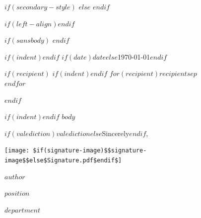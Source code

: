 \documentclass[
$if(papersize)$
$papersize$paper,
$else$
letterpaper,
$endif$,
11pt,
oneside$if(classoption)$,$endif$
$for(classoption)$
$classoption$$sep$,
$endfor$
]{article}
\begin{document}
$if(secondary-style)$
$else$
$endif$
\afterpage{\aftergroup\restoregeometry}

\thispagestyle{firstheader}  %
\pagestyle{defaultheader}  %

$if(left-align)$\RaggedRight$endif$


$if(sansbody)$
\sffamily
$endif$

$if(indent)$\noindent$endif$
$if(date)$$date$$else$\today$endif$
\smallskip

$if(recipient)$
$if(indent)$\noindent$endif$
$for(recipient)$$recipient$$sep$\\$endfor$
\par
$endif$

\smallskip

$if(indent)$\noindent$endif$  %
$body$

\bigskip
\hspace{.5\textwidth}
\begin{minipage}[]{5in}
  $if(valediction)$$valediction$$else$Sincerely$endif$,\par
  \texttt{[image: \$if(signature-image)\$\$signature-image\$\$else\$Signature.pdf\$endif\$]}\par
  \singlespace
  $author$\par
  $position$\par
  $department$\par
\end{minipage}
\end{document}
